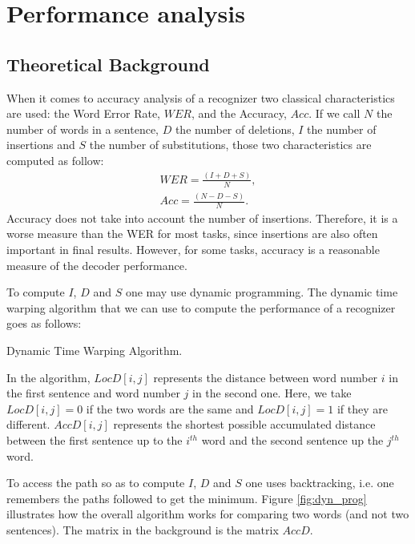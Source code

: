 \section*{Performance analysis}
\subsection*{Theoretical Background}
When it comes to accuracy analysis of a recognizer two classical characteristics are used: the Word Error Rate, $WER$, and the Accuracy, $Acc$. If we call $N$ the number of words in a sentence, $D$ the number of deletions, $I$ the number of insertions and $S$ the number of substitutions, those two characteristics are computed as follow: 
\begin{align*}
WER = \frac{(I + D + S)}{N},\\
Acc = \frac{(N-D-S)}{N}.
\end{align*}
Accuracy does not take into account the number of insertions. Therefore, it is a worse measure than the WER for most tasks, since insertions are also often important in final results. However, for some tasks, accuracy is a reasonable measure of the decoder performance. 

To compute $I$, $D$ and $S$ one may use dynamic programming. The dynamic time warping algorithm that we can use to compute the performance of a recognizer goes as follows:

\begin{algorithm}[H]
\caption{Dynamic Time Warping Algorithm.}
\end{algorithm}

In the algorithm, $LocD[i,j]$ represents the distance between word number $i$ in the first sentence and word number $j$ in the second one. Here, we take $LocD[i,j] = 0$ if the two words are the same and $LocD[i,j] = 1$ if they are different. $AccD[i,j]$ represents the shortest possible accumulated distance between the first sentence up to the $i^{th}$ word and the second sentence up the $j^{th}$ word. 

To access the path so as to compute $I$, $D$ and $S$ one uses backtracking, i.e. one remembers the paths followed to get the minimum. Figure \ref{fig:dyn_prog} illustrates how the overall algorithm works for comparing two words (and not two sentences). The matrix in the background is the matrix $AccD$.

